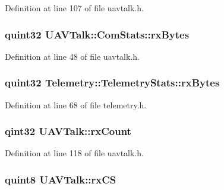 Definition at line 107 of file uavtalk.\-h.

\hypertarget{group___u_a_v_talk_plugin_ga93a6f8b7f60333a7e7afb70085ca7efd}{
\subsubsection[{rx\-Bytes}]{\setlength{\rightskip}{0pt plus 5cm}quint32 U\-A\-V\-Talk\-::\-Com\-Stats\-::rx\-Bytes}}\label{group___u_a_v_talk_plugin_ga93a6f8b7f60333a7e7afb70085ca7efd}


Definition at line 48 of file uavtalk.\-h.

\hypertarget{group___u_a_v_talk_plugin_gadda927fbb6858f5e60b6daf16d5bc94e}{
\subsubsection[{rx\-Bytes}]{\setlength{\rightskip}{0pt plus 5cm}quint32 Telemetry\-::\-Telemetry\-Stats\-::rx\-Bytes}}\label{group___u_a_v_talk_plugin_gadda927fbb6858f5e60b6daf16d5bc94e}


Definition at line 68 of file telemetry.\-h.

\hypertarget{group___u_a_v_talk_plugin_ga380dea6ca845f80612070ed17ea65655}{
\subsubsection[{rx\-Count}]{\setlength{\rightskip}{0pt plus 5cm}qint32 U\-A\-V\-Talk\-::rx\-Count\hspace{0.3cm}{\ttfamily [protected]}}}\label{group___u_a_v_talk_plugin_ga380dea6ca845f80612070ed17ea65655}


Definition at line 118 of file uavtalk.\-h.

\hypertarget{group___u_a_v_talk_plugin_gabfde70d24df43bcff2ab3c3da3f2444f}{
\subsubsection[{rx\-C\-S}]{\setlength{\rightskip}{0pt plus 5cm}quint8 U\-A\-V\-Talk\-::rx\-C\-S\hspace{0.3cm}{\ttfamily [protected]}}}\label{group___u_a_v_talk_plugin_gabfde70d24df43bcff2ab3c3da3f2444f}


